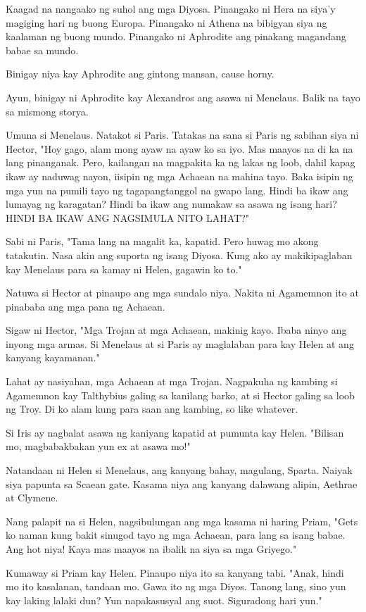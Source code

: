 \documentclass[12pt,letterpaper]{report}
\begin{document}
Kaagad na nangaako ng suhol ang mga Diyosa. Pinangako ni Hera na siya'y magiging hari ng buong Europa.
Pinangako ni Athena na bibigyan siya ng kaalaman ng buong mundo. Pinangako ni Aphrodite ang pinakang magandang babae sa mundo.

Binigay niya kay Aphrodite ang gintong mansan, cause horny.

Ayun, binigay ni Aphrodite kay Alexandros ang asawa ni Menelaus. Balik na tayo sa mismong storya.

Umuna si Menelaus. Natakot si Paris. Tatakas na sana si Paris ng sabihan siya ni Hector,
"Hoy gago, alam mong ayaw na ayaw ko sa iyo. Mas maayos na di ka na lang pinanganak. Pero,
kailangan na magpakita ka ng lakas ng loob, dahil kapag ikaw ay naduwag nayon, iisipin ng mga Achaean na mahina tayo.
Baka isipin ng mga yun na pumili tayo ng tagapangtanggol na gwapo lang.
Hindi ba ikaw ang lumayag ng karagatan? Hindi ba ikaw ang numakaw sa asawa ng isang hari?
HINDI BA IKAW ANG NAGSIMULA NITO LAHAT?"

Sabi ni Paris, "Tama lang na magalit ka, kapatid. Pero huwag mo akong tatakutin.
Nasa akin ang suporta ng isang Diyosa. Kung ako ay makikipaglaban kay Menelaus para sa kamay ni Helen,
gagawin ko to."

Natuwa si Hector at pinaupo ang mga sundalo niya. Nakita ni Agamemnon ito at pinababa ang mga pana ng Achaean.

Sigaw ni Hector, "Mga Trojan at mga Achaean, makinig kayo. Ibaba ninyo ang inyong mga armas.
Si Menelaus at si Paris ay maglalaban para kay Helen at ang kanyang kayamanan."

Lahat ay nasiyahan, mga Achaean at mga Trojan. Nagpakuha ng kambing si Agamemnon kay Talthybius galing sa kanilang barko,
at si Hector galing sa loob ng Troy. Di ko alam kung para saan ang kambing, so like whatever.

Si Iris ay nagbalat asawa ng kaniyang kapatid at pumunta kay Helen. "Bilisan mo,
magbabakbakan yun ex at asawa mo!"

Natandaan ni Helen si Menelaus, ang kanyang bahay, magulang, Sparta. Naiyak siya papunta sa Scaean gate.
Kasama niya ang kanyang dalawang alipin, Aethrae at Clymene.

Nang palapit na si Helen, nagsibulungan ang mga kasama ni haring Priam,
"Gets ko naman kung bakit sinugod tayo ng mga Achaean, para lang sa isang babae. Ang hot niya!
Kaya mas maayos na ibalik na siya sa mga Griyego."

Kumaway si Priam kay Helen. Pinaupo niya ito sa kanyang tabi. "Anak, hindi mo ito kasalanan, tandaan mo.
Gawa ito ng mga Diyos. Tanong lang, sino yun kay laking lalaki dun? Yun napakasusyal ang suot. Siguradong hari yun."
\end{document}

